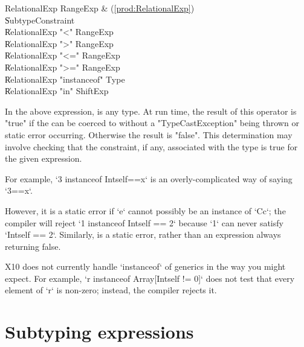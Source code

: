 \begin{bbgrammar}
       RelationalExp \: RangeExp & (\ref{prod:RelationalExp}) \\
                    \| SubtypeConstraint \\
                    \| RelationalExp \xcd"<" RangeExp \\
                    \| RelationalExp \xcd">" RangeExp \\
                    \| RelationalExp \xcd"<=" RangeExp \\
                    \| RelationalExp \xcd">=" RangeExp \\
                    \| RelationalExp \xcd"instanceof" Type \\
                    \| RelationalExp \xcd"in" ShiftExp \\
\end{bbgrammar}

In the above expression,  is any type. At run time, the
result of this operator is \xcd"true" if the
 can be coerced to 
without a \xcd"TypeCastException" being thrown or static error occurring.
Otherwise the result is \xcd"false". This determination may involve checking
that the constraint, if any, associated with the type is true for the given
expression.

For example, \xcd`3 instanceof Int{self==x}` is an overly-complicated way of
saying \xcd`3==x`.


However, it is a static error if \xcd`e` cannot possibly be an instance of
\xcd`C{c}`; the compiler will reject \xcd`1 instanceof Int{self == 2}` because
\xcd`1` can never satisfy \xcd`Int{self == 2}`. Similarly,  is a static error, rather than an expression always returning false. 

\limitationx
X10 does not currently handle \xcd`instanceof` of generics in the way you
might expect.  For example, \xcd`r instanceof Array[Int{self != 0}]` does
not test that every element of \xcd`r` is non-zero; instead, the compiler
rejects it.


\section{Subtyping expressions}
\index{\Xcd{<:}}
\index{\Xcd{:>}}


